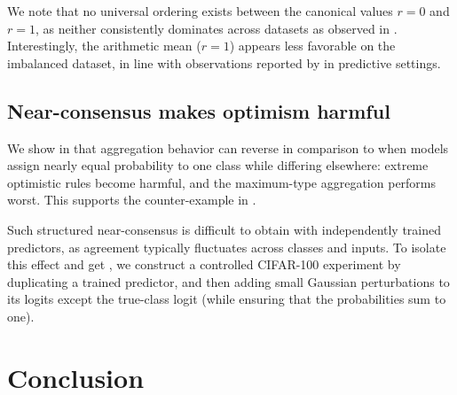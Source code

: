 \documentclass[accepted]{uai2026} %
\begin{document}
We note that no universal ordering exists between the canonical values $r=0$ and $r=1$, as neither consistently dominates across datasets as observed in . Interestingly, the arithmetic mean ($r=1$) appears less favorable on the imbalanced dataset, in line with observations reported by \citet{buchanan2023effects} in predictive settings.




\subsection{Near-consensus makes optimism harmful}

We show in  that aggregation behavior can reverse in comparison to  when models assign nearly equal probability to one class while differing elsewhere: extreme optimistic rules become harmful, and the maximum-type aggregation performs worst. This supports the counter-example in .

Such structured near-consensus is difficult to obtain with independently trained predictors, as agreement typically fluctuates across classes and inputs. To isolate this effect and get , we construct a controlled CIFAR-100 experiment by duplicating a trained predictor, and then adding small Gaussian perturbations to its logits except the true-class logit (while ensuring that the probabilities sum to one).




\section{Conclusion}
\end{document}
